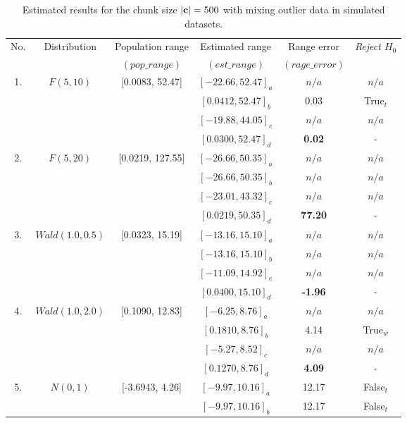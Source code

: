 \documentclass[a4paper,fleqn]{cas-dc}
\begin{document}
\begin{table}[h!]
\centering
\caption{Estimated results for the chunk size $|{\bf c}|=500$ with mixing outlier data in simulated datasets.}
\label{tab:res_sim500_noise}
\begin{threeparttable}
\begin{tabular}{|c|c|c|c|c|c|}
\hline
\multirow{2}{*}{No.} & \multirow{2}{*}{Distribution} & Population range & 
Estimated range&Range error& \multirow{2}{*}{\it{Reject} $H_0$} \\
&&$(pop\_range)$&$(est\_range)$&$(rage\_error)$& \\
\hline
\multirow{4}{*}{1.} & \multirow{4}{*}{$F(5 ,10)$}&\multirow{4}{*}{[0.0083, 52.47]} & $[-22.66, 52.47]_a$& 
    $n/a$ & $n/a$ \\
&&&$[0.0412, 52.47]_b$ & 0.03 & True$_t$\\
&&&$[-19.88, 44.05]_c$ & $n/a$ & $n/a$\\
&&&$[0.0300, 52.47]_d$ & \bf{0.02} & - \\
\hline
\multirow{4}{*}{2.} & \multirow{4}{*}{$F(5 ,20)$}&\multirow{4}{*}{[0.0219, 127.55]} & $[-26.66, 50.35]_a$& 
    $n/a$ & $n/a$\\
&&&$[-26.66, 50.35]_b$ & $n/a$& $n/a$\\
&&&$[-23.01, 43.32]_c$ & $n/a$ & $n/a$\\
&&&$[0.0219, 50.35]_d$ & \bf{77.20} & - \\
\hline
\multirow{4}{*}{3.} & \multirow{4}{*}{$Wald(1.0 ,0.5)$}&\multirow{4}{*}{[0.0323, 15.19]} & 
$[-13.16, 15.10]_a$& 
    $n/a$  & $n/a$\\
    &&&$[-13.16, 15.10]_b$ & $n/a$  &$n/a$ \\
    &&&$[-11.09, 14.92]_c$ & $n/a$  &$n/a$ \\
    &&&$[0.0400, 15.10]_d$ & \bf{-1.96}  &- \\
\hline
\multirow{4}{*}{4.} & \multirow{4}{*}{$Wald(1.0 ,2.0)$}&\multirow{4}{*}{[0.1090, 12.83]} & 
$[-6.25, 8.76]_a$& 
    $n/a$ & $n/a$ \\
    &&&$[0.1810, 8.76]_b$ &   4.14    & True$_w$\\
    &&&$[-5.27, 8.52]_c$ &    $n/a$  & $n/a$\\
    &&&$[0.1270, 8.76]_d$ & \bf{4.09} & - \\
\hline
\multirow{4}{*}{5.} & \multirow{4}{*}{$N(0 ,1)$}&\multirow{4}{*}{[-3.6943, 4.26]} & $[-9.97, 10.16]_a$& 
    12.17 &False$_t$\\
    &&&$[-9.97, 10.16]_b$ & 12.17 &False$_t$\\

\end{tabular}
\end{threeparttable}
\end{table}
\end{document}
